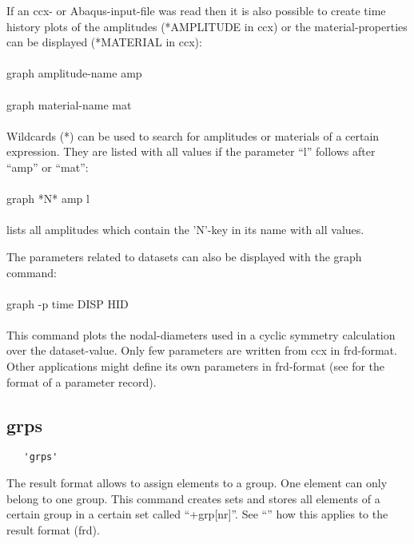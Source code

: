 \documentclass{article}
\begin{document}
If an ccx- or Abaqus-input-file was read then it is also possible to create time history plots of the amplitudes (*AMPLITUDE in ccx) or the material-properties can be displayed (*MATERIAL in ccx):\\\\graph amplitude-name amp\\\\graph material-name mat\\\\Wildcards (*) can be used to search for amplitudes or materials of a certain expression. They are listed with all values if the parameter ``l'' follows after ``amp'' or ``mat'':\\\\graph *N* amp l\\\\lists all amplitudes which contain the 'N'-key in its name with all values.

The parameters related to datasets can also be displayed with the graph command:\\\\graph -p time DISP HID\\\\This command plots the nodal-diameters used in a cyclic symmetry calculation over the dataset-value. Only few parameters are written from ccx in frd-format. Other applications might define its own parameters in frd-format (see  for the format of a parameter record).  

\subsection{\label{grps}grps}
\begin{verbatim}
   'grps'
\end{verbatim}
The result format allows to assign elements to a group. One element can only belong to one group. This command creates sets and stores all elements of a certain group in a certain set called ``+grp[nr]''. See ``'' how this applies to the result format (frd).
\end{document}
